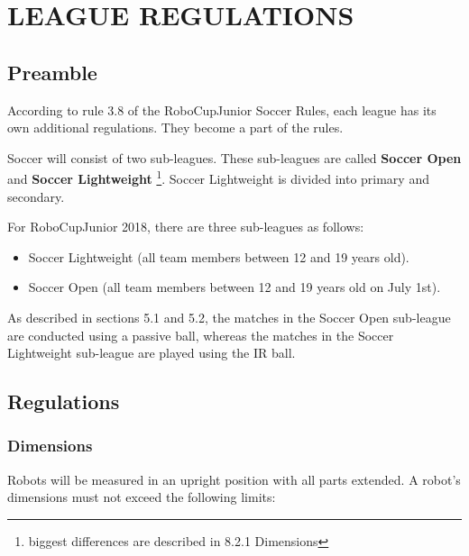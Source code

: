 \documentclass{article}
\begin{document}
\section{LEAGUE REGULATIONS \label{ref-052}}

\subsection{ Preamble \label{ref-053}}

According to rule 3.8 of the RoboCupJunior Soccer Rules, each league has its
own additional regulations. They become a part of the rules.

Soccer will consist of two sub-leagues. These sub-leagues are called
\textbf{Soccer Open} and \textbf{Soccer Lightweight} \footnote{biggest
    differences are described in 8.2.1 Dimensions}. Soccer Lightweight is
divided into primary and secondary.

For RoboCupJunior 2018, there are three sub-leagues as follows:

\begin{itemize}

\item Soccer Lightweight (all team members between 12 and 19 years old).

\item Soccer Open (all team members between 12 and 19 years old on July 1st).

\end{itemize}

As described in sections 5.1 and 5.2, the matches in the Soccer Open sub-league
are conducted using a passive ball, whereas the matches in the Soccer
Lightweight sub-league are played using the IR ball.

\subsection{Regulations \label{ref-054}}

\subsubsection{Dimensions \label{ref-055}}

Robots will be measured in an upright position with all parts extended. A
robot's dimensions must not exceed the following limits:
\end{document}
